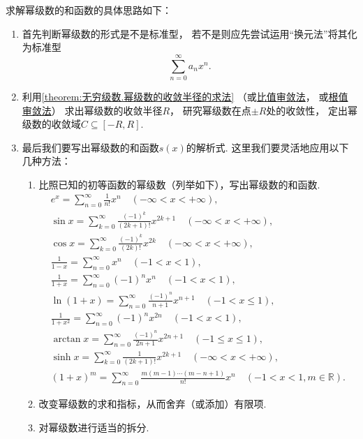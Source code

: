 求解幂级数的和函数的具体思路如下：
\begin{enumerate}
\item 首先判断幂级数的形式是不是标准型，%
若不是则应先尝试运用“换元法”将其化为标准型\[
\sum\limits_{n=0}^\infty a_n x^n.
\]

\item 利用\cref{theorem:无穷级数.幂级数的收敛半径的求法}%
（或\hyperref[theorem:无穷级数.正项级数的比值审敛法]{比值审敛法}，%
或\hyperref[theorem:无穷级数.正项级数的根值审敛法]{根值审敛法}）%
求出幂级数的收敛半径\(R\)，%
研究幂级数在点\(\pm R\)处的收敛性，%
定出幂级数的收敛域\(C\subseteq[-R,R]\).

\item 最后我们要写出幂级数的和函数\(s(x)\)的解析式.
这里我们要灵活地应用以下几种方法：
\begin{enumerate}
	\item 比照已知的初等函数的幂级数（列举如下），写出幂级数的和函数.
	\begin{gather*}
	e^x = \sum\limits_{n=0}^\infty \frac{1}{n!} x^n
		\quad(-\infty<x<+\infty), \\
	\sin x = \sum\limits_{k=0}^\infty \frac{(-1)^k}{(2k+1)!} x^{2k+1}
		\quad(-\infty<x<+\infty), \\
	\cos x = \sum\limits_{k=0}^\infty \frac{(-1)^k}{(2k)!} x^{2k}
		\quad(-\infty<x<+\infty), \\
	\frac{1}{1-x} = \sum\limits_{n=0}^\infty x^n
		\quad(-1<x<1), \\
	\frac{1}{1+x} = \sum\limits_{n=0}^\infty (-1)^n x^n
		\quad(-1<x<1), \\
	\ln(1+x) = \sum\limits_{n=0}^\infty \frac{(-1)^n}{n+1} x^{n+1}
		\quad(-1<x\leq1), \\
	\frac{1}{1+x^2} = \sum\limits_{n=0}^\infty (-1)^n x^{2n}
		\quad(-1<x<1), \\
	\arctan x = \sum\limits_{n=0}^\infty \frac{(-1)^n}{2n+1} x^{2n+1}
		\quad(-1 \leq x \leq 1), \\
	\sinh x = \sum\limits_{k=0}^\infty \frac{1}{(2k+1)!} x^{2k+1}
		\quad(-\infty<x<+\infty), \\
	(1+x)^m = \sum\limits_{n=0}^\infty \frac{m(m-1)\dotsm(m-n+1)}{n!} x^n
		\quad(-1<x<1,m\in\mathbb{R}).
	\end{gather*}

	\item 改变幂级数的求和指标，从而舍弃（或添加）有限项.

	\item 对幂级数进行适当的拆分.


\end{enumerate}
\end{enumerate}
